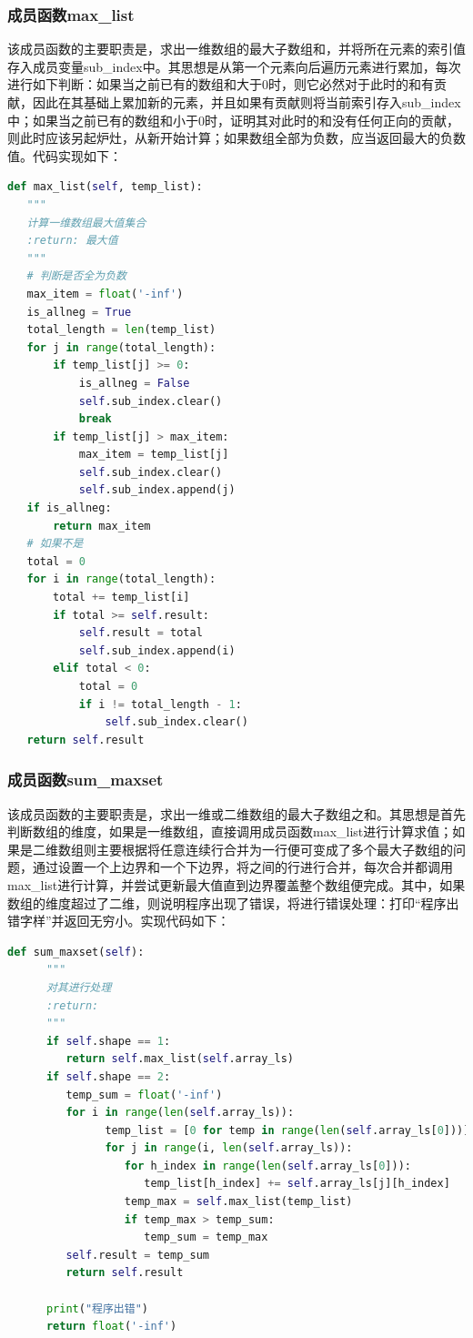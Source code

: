 \documentclass{article}
\begin{document}
\subsubsection{成员函数max\_list}
该成员函数的主要职责是，求出一维数组的最大子数组和，并将所在元素的索引值存入成员变量sub\_index中。其思想是从第一个元素向后遍历元素进行累加，每次进行如下判断：如果当之前已有的数组和大于0时，则它必然对于此时的和有贡献，因此在其基础上累加新的元素，并且如果有贡献则将当前索引存入sub\_index中；如果当之前已有的数组和小于0时，证明其对此时的和没有任何正向的贡献，则此时应该另起炉灶，从新开始计算；如果数组全部为负数，应当返回最大的负数值。代码实现如下：
\begin{lstlisting}[language = python]
def max_list(self, temp_list):
   """
   计算一维数组最大值集合
   :return: 最大值
   """
   # 判断是否全为负数
   max_item = float('-inf')
   is_allneg = True
   total_length = len(temp_list)
   for j in range(total_length):
       if temp_list[j] >= 0:
           is_allneg = False
           self.sub_index.clear()
           break
       if temp_list[j] > max_item:
           max_item = temp_list[j]
           self.sub_index.clear()
           self.sub_index.append(j)
   if is_allneg:
       return max_item
   # 如果不是
   total = 0
   for i in range(total_length):
       total += temp_list[i]
       if total >= self.result:
           self.result = total
           self.sub_index.append(i)
       elif total < 0:
           total = 0
           if i != total_length - 1:
               self.sub_index.clear()
   return self.result
\end{lstlisting}
\subsubsection{成员函数sum\_maxset}
该成员函数的主要职责是，求出一维或二维数组的最大子数组之和。其思想是首先判断数组的维度，如果是一维数组，直接调用成员函数max\_list进行计算求值；如果是二维数组则主要根据将任意连续行合并为一行便可变成了多个最大子数组的问题，通过设置一个上边界和一个下边界，将之间的行进行合并，每次合并都调用max\_list进行计算，并尝试更新最大值直到边界覆盖整个数组便完成。\textcolor[rgb]{0,0.8,1}{其中，如果数组的维度超过了二维，则说明程序出现了错误，将进行错误处理：打印“程序出错字样”并返回无穷小。}实现代码如下：
\begin{lstlisting}[language = python]
def sum_maxset(self):
      """
      对其进行处理
      :return:
      """
      if self.shape == 1:
         return self.max_list(self.array_ls)
      if self.shape == 2:
         temp_sum = float('-inf')
         for i in range(len(self.array_ls)):
               temp_list = [0 for temp in range(len(self.array_ls[0]))]
               for j in range(i, len(self.array_ls)):
                  for h_index in range(len(self.array_ls[0])):
                     temp_list[h_index] += self.array_ls[j][h_index]
                  temp_max = self.max_list(temp_list)
                  if temp_max > temp_sum:
                     temp_sum = temp_max
         self.result = temp_sum
         return self.result

      print("程序出错")
      return float('-inf')
\end{lstlisting}
\end{document}
